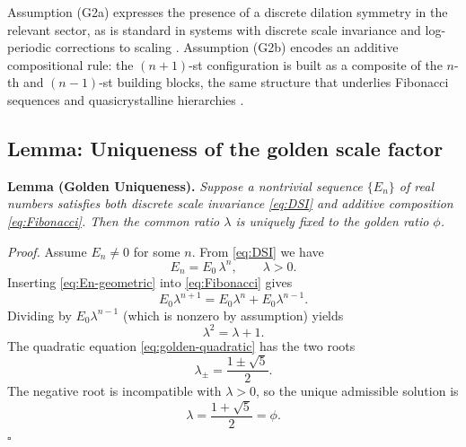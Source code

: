 \documentclass[10pt,reprint,aps,onecolumn,nofootinbib]{revtex4-2}
\begin{document}
        Assumption (G2a) expresses the presence of a discrete dilation symmetry
        in the relevant sector, as is standard in systems with discrete scale
        invariance and log-periodic corrections to scaling
        \cite{Sornette1998,GluzmanSornette2002}. Assumption (G2b) encodes an
        additive compositional rule: the $(n+1)$-st configuration is built as a
        composite of the $n$-th and $(n-1)$-st building blocks, the same
        structure that underlies Fibonacci sequences and quasicrystalline
        hierarchies \cite{BaakeGrimm2013}.

    \subsection{Lemma: Uniqueness of the golden scale factor}

        \textbf{Lemma (Golden Uniqueness).}
        \emph{Suppose a nontrivial sequence $\{E_n\}$ of real numbers satisfies
        both discrete scale invariance \eqref{eq:DSI} and additive composition
        \eqref{eq:Fibonacci}. Then the common ratio $\lambda$ is uniquely fixed
        to the golden ratio $\phi$.}

        \medskip
        \noindent\emph{Proof.}
        Assume $E_n\neq 0$ for some $n$. From \eqref{eq:DSI} we have
        \begin{equation}
            E_n = E_0\,\lambda^{n},
            \qquad
            \lambda>0.
            \label{eq:En-geometric}
        \end{equation}
        Inserting \eqref{eq:En-geometric} into \eqref{eq:Fibonacci} gives
        \begin{equation}
            E_0\lambda^{n+1}
            = E_0\lambda^n + E_0\lambda^{n-1}.
        \end{equation}
        Dividing by $E_0\lambda^{n-1}$ (which is nonzero by assumption) yields
        \begin{equation}
            \lambda^{2} = \lambda + 1.
            \label{eq:golden-quadratic}
        \end{equation}
        The quadratic equation \eqref{eq:golden-quadratic} has the two roots
        \begin{equation}
            \lambda_{\pm} = \frac{1\pm\sqrt{5}}{2}.
        \end{equation}
        The negative root is incompatible with $\lambda>0$, so the unique
        admissible solution is
        \begin{equation}
            \lambda = \frac{1+\sqrt{5}}{2} = \phi.
        \end{equation}
        \hfill$\square$
\end{document}
